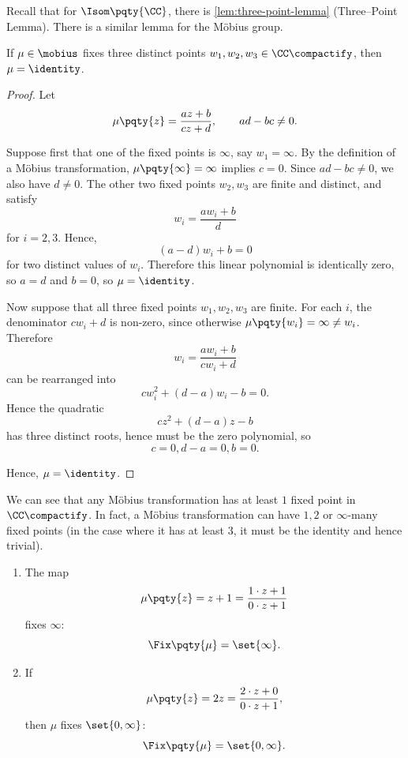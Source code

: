 Recall that for \(\Isom\pqty{\CC}\), there is \autoref{lem:three-point-lemma} (Three--Point Lemma). There is a similar lemma for the M\"{o}bius group.

\begin{lemma}
    \label{lem:three-point-mobius}%
    If \(\mu \in \mobius\) fixes three distinct points \(w_1, w_2, w_3 \in \CC\compactify\), then \(\mu = \identity\).
\end{lemma}

\begin{proof}
    Let
    \[
        \mu\pqty{z} = \frac{az + b}{cz + d},
        \qquad ad-bc\neq 0.
    \]

    Suppose first that one of the fixed points is \(\infty\), say
    \(w_1 = \infty\). By the definition of a M\"{o}bius transformation,
    \(\mu\pqty{\infty} = \infty\) implies \(c = 0\). Since \(ad - bc \neq 0\),
    we also have \(d \neq 0\). The other two fixed points \(w_2, w_3\) are finite and distinct, and satisfy
    \[
        w_i = \frac{a w_i + b}{d}
    \]
    for \(i=2,3\). Hence,
    \[
        (a - d) w_i + b = 0
    \]
    for two distinct values of \(w_i\). Therefore this linear polynomial is identically zero, so \(a = d\) and \(b = 0\), so \(\mu = \identity\).

    Now suppose that all three fixed points \(w_1, w_2, w_3\) are finite.
    For each \(i\), the denominator \(c w_i + d\) is non-zero, since otherwise
    \(\mu\pqty{w_i} = \infty \neq w_i\). Therefore
    \[
        w_i = \frac{a w_i + b}{c w_i + d}
    \]
    can be rearranged into
    \[
        c w_i^2 + (d - a) w_i - b = 0.
    \]
    Hence the quadratic
    \[
        c z^2 + (d - a) z - b
    \]
    has three distinct roots, hence must be the zero polynomial, so
    \[
        c = 0, d - a = 0, b = 0.
    \]
    
    Hence, \(\mu = \identity\).
\end{proof}

We can see that any M\"{o}bius transformation has at least \(1\) fixed point in \(\CC\compactify\). In fact, a M\"{o}bius transformation can have \(1, 2\) or \(\infty\)-many fixed points (in the case where it has at least \(3\), it must be the identity and hence trivial).

\begin{examples*}
    \begin{enumerate}
        \item The map
        \[
            \mu\pqty{z} = z + 1 = \frac{1 \cdot z + 1}{0 \cdot z + 1}
        \]
        fixes \(\infty\):
        \[
            \Fix\pqty{\mu} = \set{\infty}.
        \]

        \item If
        \[
        \mu\pqty{z} = 2z = \frac{2 \cdot z + 0}{0 \cdot z + 1},
        \]
        then \(\mu\) fixes \(\set{0, \infty}\):
        \[
            \Fix\pqty{\mu} = \set{0, \infty}.
        \]
    \end{enumerate}
\end{examples*}

